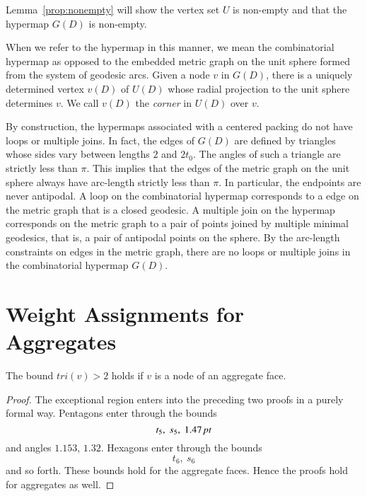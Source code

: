 Lemma~\ref{prop:nonempty} will show the vertex set $U$ is non-empty
and that the hypermap $G(D)$ is non-empty.

When we refer to the hypermap in this manner, we mean the
combinatorial hypermap as opposed to the embedded metric graph on
the unit sphere formed from the system of geodesic arcs.  Given a
node $v$ in $G(D)$, there is a uniquely determined vertex $v(D)$ of
$U(D)$ whose radial projection to the unit sphere determines $v$. We
call $v(D)$ the {\it corner} in $U(D)$ over $v$.
%

By construction, the hypermaps associated with a centered packing
do not have loops or multiple joins.  In fact, the edges of $G(D)$
are defined by triangles whose sides vary between lengths $2$ and
$2t_0 $. The angles of such a triangle are strictly less than
$\pi$. This implies that the edges of the metric graph on the unit
sphere always have arc-length strictly less than $\pi$. In
particular, the endpoints are never antipodal.  A loop on the
combinatorial hypermap corresponds to a edge on the metric graph
that is a closed geodesic. A multiple join on the hypermap
corresponds on the metric graph to a pair of points joined by
multiple minimal geodesics, that is, a pair of antipodal points on
the sphere.  By the arc-length constraints on edges in the metric
graph, there are no loops or multiple joins in the combinatorial
hypermap $G(D)$.


\section{Weight Assignments for Aggregates}

\begin{lemma} The bound $tri(v)>2$ holds if $v$ is a node
of an aggregate face.
\end{lemma}

\begin{proof}
The exceptional region enters into the preceding two proofs in a
purely formal way.  Pentagons enter through the bounds
    $$t_5,\ s_5,\ 1.47\,\hbox{\it pt}$$
and angles $1.153$, $1.32$.  Hexagons enter through the bounds
    $$t_6,\ s_6$$
and so forth.  These bounds hold for the aggregate faces.  Hence the
proofs hold for aggregates as well.
\end{proof}


